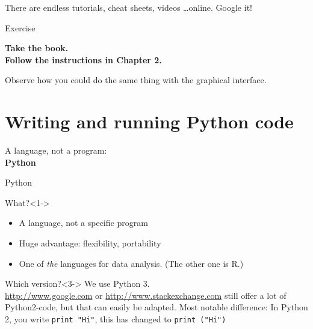 \documentclass{beamer}
\begin{document}
{
	\begin{frame}[plain]
		\color{red}\huge{There are endless tutorials, cheat sheets, videos \ldots online. Google it!}
	\end{frame}
}


\begin{frame}
	Exercise 
	
	\vspace{1cm}
	\textbf{Take the book.\\Follow the instructions in Chapter 2.}
	
	Observe how you could do the same thing with the graphical interface.
\end{frame}




\section{Writing and running Python code}

\begin{frame}
	A language, not a program:\\
	\textbf{Python}
\end{frame}


\begin{frame}{Python}
	\begin{block}{What?}<1->
		\begin{itemize}
			\item A language, not a specific program
			\item Huge advantage: flexibility, portability
			\item One of \emph{the} languages for data analysis. \tiny{(The other one is R.)}
		\end{itemize}
	\end{block}
	
	\begin{block}{Which version?}<3->
		We use Python 3. \\ 
		\footnotesize{\url{http://www.google.com} or \url{http://www.stackexchange.com} still offer a lot of Python2-code, but that can easily be adapted. Most notable difference: In Python 2, you write {\tt print "Hi"}, this has changed to {\tt print ("Hi")}}\\
	\end{block}
\end{frame}
\end{document}
